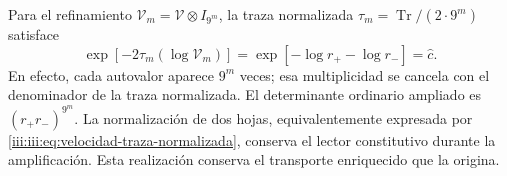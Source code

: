 Para el refinamiento $\mathcal V_m=\mathcal V\otimes I_{9^m}$, la
traza normalizada $\tau_m=\operatorname{Tr}/(2\cdot9^m)$ satisface
\begin{equation}
 \exp[-2\tau_m(\log\mathcal V_m)]
 =\exp[-\log r_+-\log r_-]=\widehat c.
 \label{iii:iii:eq:velocidad-traza-normalizada}
\end{equation}
En efecto, cada autovalor aparece $9^m$ veces; esa multiplicidad se
cancela con el denominador de la traza normalizada. El determinante
ordinario ampliado es $(r_+r_-)^{9^m}$. La normalización de dos hojas,
equivalentemente expresada por \eqref{iii:iii:eq:velocidad-traza-normalizada},
conserva el lector constitutivo durante la amplificación. Esta
realización conserva el transporte enriquecido que la origina.
